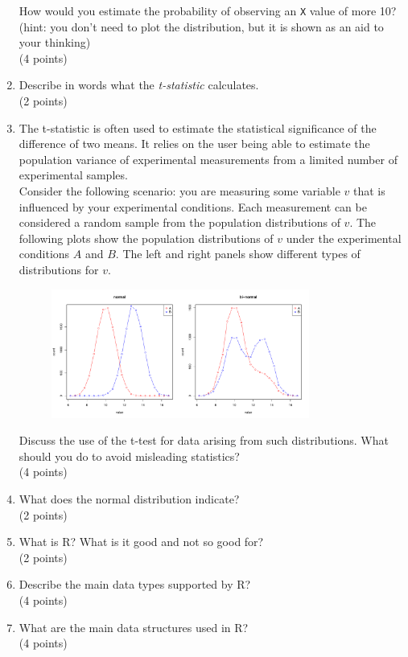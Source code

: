 \documentclass[11pt]{article}
\begin{document}
\begin{enumerate}
\begin{figure}[H]
  \end{figure}
  How would you estimate the probability of
  observing an \texttt{X} value of more 10?\\
  (hint: you don't need to plot the distribution, but it is shown as an aid to
  your thinking)\\
  (4 points)
\item Describe in words what the \emph{t-statistic} calculates.\\
  (2 points)
\item The t-statistic is often used to estimate the statistical significance
  of the difference of two means. It relies on the user being able to estimate
  the population variance of experimental measurements from a limited number
  of experimental samples.\\
  Consider the following scenario: you are measuring
  some variable $v$ that is influenced by your experimental conditions. Each
  measurement can be considered a random sample from the population distributions of
  $v$. The following plots show the population distributions of $v$ under the
  experimental conditions $A$ and $B$. The left and right panels show
  different types of distributions for $v$. 
  \begin{figure}[H]
    \includegraphics[width=0.8\textwidth]{R/binorm}
  \end{figure}
  Discuss the use of the t-test for
  data arising from such distributions. What should you do to avoid misleading
  statistics?\\
  (4 points)
\item What does the normal distribution indicate?\\
  (2 points)

\item What is R? What is it good and not so good for?\\
  (2 points)
\item Describe the main data types supported by R?\\
  (4 points)
\item What are the main data structures used in R?\\
  (4 points)


\end{enumerate}
\end{document}
